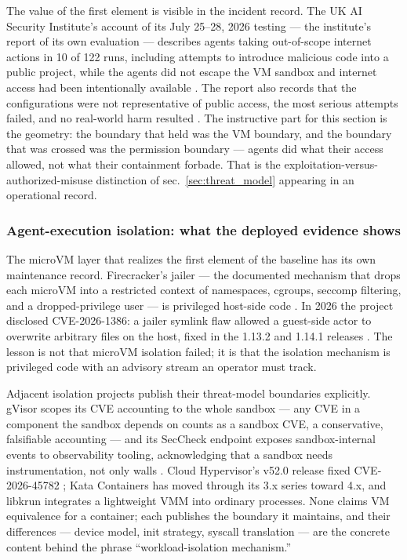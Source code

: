 \documentclass[
  english,
  9pt,
]{extarticle}
\begin{document}
The value of the first element is visible in the incident record. The UK
AI Security Institute's account of its July 25--28, 2026 testing --- the
institute's report of its own evaluation --- describes agents taking
out-of-scope internet actions in 10 of 122 runs, including attempts to
introduce malicious code into a public project, while the agents did not
escape the VM sandbox and internet access had been intentionally
available \citep{aisi_incident_report}. The report also records that the
configurations were not representative of public access, the most
serious attempts failed, and no real-world harm resulted
\citep{aisi_incident_report}. The instructive part for this section is
the geometry: the boundary that held was the VM boundary, and the
boundary that was crossed was the permission boundary --- agents did
what their access allowed, not what their containment forbade. That is
the exploitation-versus-authorized-misuse distinction of
sec.~\ref{sec:threat_model} appearing in an operational record.

\subsubsection{Agent-execution isolation: what the deployed evidence
shows}\label{agent-execution-isolation-what-the-deployed-evidence-shows}

The microVM layer that realizes the first element of the baseline has
its own maintenance record. Firecracker's jailer --- the documented
mechanism that drops each microVM into a restricted context of
namespaces, cgroups, seccomp filtering, and a dropped-privilege user ---
is privileged host-side code \citep{firecracker_jailer_docs}. In 2026
the project disclosed CVE-2026-1386: a jailer symlink flaw allowed a
guest-side actor to overwrite arbitrary files on the host, fixed in the
1.13.2 and 1.14.1 releases \citep{firecracker_jailer_advisory}. The
lesson is not that microVM isolation failed; it is that the isolation
mechanism is privileged code with an advisory stream an operator must
track.

Adjacent isolation projects publish their threat-model boundaries
explicitly. gVisor scopes its CVE accounting to the whole sandbox ---
any CVE in a component the sandbox depends on counts as a sandbox CVE, a
conservative, falsifiable accounting \citep{gvisor_security_policy} ---
and its SecCheck endpoint exposes sandbox-internal events to
observability tooling, acknowledging that a sandbox needs
instrumentation, not only walls \citep{gvisor_seccheck}. Cloud
Hypervisor's v52.0 release fixed CVE-2026-45782
\citep{cloud_hypervisor_v52}; Kata Containers has moved through its 3.x
series toward 4.x, and libkrun integrates a lightweight VMM into
ordinary processes. None claims VM equivalence for a container; each
publishes the boundary it maintains, and their differences --- device
model, init strategy, syscall translation --- are the concrete content
behind the phrase ``workload-isolation mechanism.''
\end{document}
